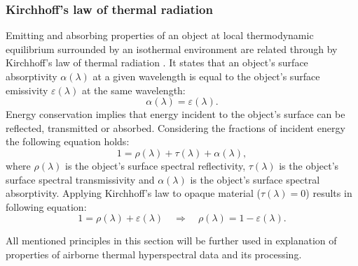\subsubsection*{Kirchhoff's law of thermal radiation}
Emitting and absorbing properties of an object at local thermodynamic equilibrium surrounded by an isothermal environment are related through by Kirchhoff's law of thermal radiation \cite{K60}. It states that an object's surface absorptivity $\alpha(\lambda)$ at a given wavelength is equal to the object's surface emissivity $\varepsilon(\lambda)$ at the same wavelength:
$$ \alpha(\lambda) = \varepsilon(\lambda). $$
Energy conservation implies that energy incident to the object's surface can be reflected, transmitted or absorbed. Considering the fractions of incident energy the following equation holds:
$$ 1 = \rho(\lambda) + \tau(\lambda) + \alpha(\lambda), $$
where $\rho(\lambda)$ is the object's surface spectral reflectivity, $\tau(\lambda)$ is the object's surface spectral transmissivity and $\alpha(\lambda)$ is the object's surface spectral absorptivity. Applying Kirchhoff's law to opaque material ($\tau(\lambda) = 0$) results in following equation:
\begin{equation} 
1 = \rho(\lambda) + \varepsilon(\lambda) \quad \Rightarrow \quad \rho(\lambda) = 1 - \varepsilon(\lambda).
\label{eq:KirchHoffsLawImplication}
\end{equation}

All mentioned principles in this section will be further used in explanation of properties of airborne thermal hyperspectral data and its processing.